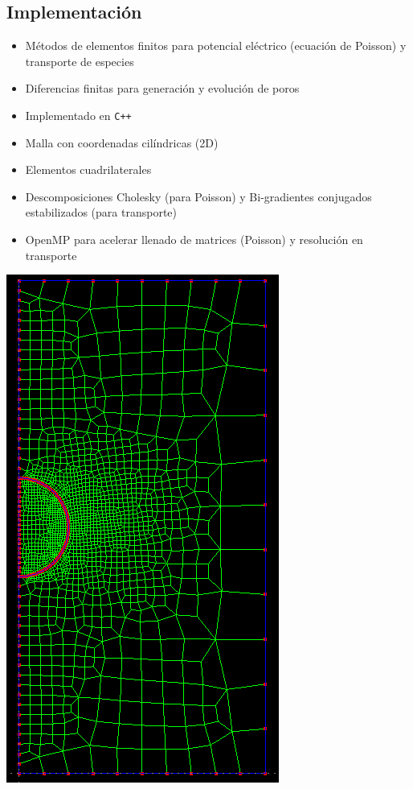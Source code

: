 \documentclass[a0,portrait]{a0poster}
\begin{document}
\begin{multicols}{2}
\section*{Implementación}
\begin{multicols}{2}
	\begin{itemize}
		\item Métodos de elementos finitos para potencial eléctrico (ecuación de Poisson) y transporte de especies
		\item Diferencias finitas para generación y evolución de poros
		\item Implementado en \texttt{C++}
		\item Malla con coordenadas cilíndricas (2D)
		\item Elementos cuadrilaterales
		\item Descomposiciones Cholesky (para Poisson) y Bi-gradientes conjugados estabilizados (para transporte)
		\item OpenMP para acelerar llenado de matrices (Poisson) y resolución en transporte
	\end{itemize}

		\columnbreak
		\begin{center}
			\includegraphics[keepaspectratio, height = 0.18\textheight]{grande} 
		\end{center}


\end{multicols}
\end{multicols}
\end{document}
